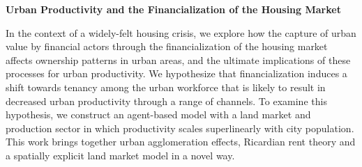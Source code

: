 \begin{center}\textbf{Urban Productivity and the Financialization of the Housing Market}\end{center}

In the context of a widely-felt housing crisis, we explore how the capture of urban value by financial actors through the financialization of the housing market affects ownership patterns in urban areas, and the ultimate implications of these processes for urban productivity.
We hypothesize that financialization induces a shift towards tenancy among the urban workforce that 
is likely to result in decreased urban productivity through a range of channels. To examine this hypothesis, we construct an agent-based model with a land market and production sector in which productivity scales superlinearly with city population. This work brings together urban agglomeration effects, Ricardian rent theory and a spatially explicit land market model in a novel way. 



